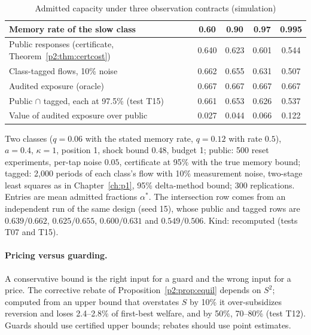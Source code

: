 \begin{table}[t]\centering\small
\begin{threeparttable}
\caption{Admitted capacity under three observation contracts (simulation)}\label{p2:tab:discsim}
\begin{tabular}{lcccc}
\toprule
Memory rate of the slow class & 0.60 & 0.90 & 0.97 & 0.995\\
\midrule
Public responses (certificate, Theorem~\ref{p2:thm:certcost}) & 0.640 & 0.623 & 0.601 & 0.544\\
Class-tagged flows, 10\% noise & 0.662 & 0.655 & 0.631 & 0.507\\
Audited exposure (oracle) & 0.667 & 0.667 & 0.667 & 0.667\\
Public $\cap$ tagged, each at 97.5\% (test T15) & 0.661 & 0.653 & 0.626 & 0.537\\
\midrule
Value of audited exposure over public & 0.027 & 0.044 & 0.066 & 0.122\\
\bottomrule
\end{tabular}
\begin{tablenotes}\footnotesize\item Two classes ($q=0.06$ with the stated memory rate, $q=0.12$ with rate $0.5$), $a=0.4$, $\kappa=1$, position 1, shock bound $0.48$, budget 1; public: 500 reset experiments, per-tap noise $0.05$, certificate at 95\% with the true memory bound; tagged: 2{,}000 periods of each class's flow with 10\% measurement noise, two-stage least squares as in Chapter~\ref{ch:p1}, 95\% delta-method bound; 300 replications. Entries are mean admitted fractions $\alpha^*$. The intersection row comes from an independent run of the same design (seed 15), whose public and tagged rows are $0.639/0.662$, $0.625/0.655$, $0.600/0.631$ and $0.549/0.506$. Kind: recomputed (tests T07 and T15).\end{tablenotes}
\end{threeparttable}
\end{table}

\paragraph{Pricing versus guarding.} A conservative bound is the right input for a guard and the wrong input for a price. The corrective rebate of Proposition~\ref{p2:prop:equil} depends on $S^2$; computed from an upper bound that overstates $S$ by 10\% it over-subsidizes reversion and loses 2.4--2.8\% of first-best welfare, and by 50\%, 70--80\% (test T12). Guards should use certified upper bounds; rebates should use point estimates.


